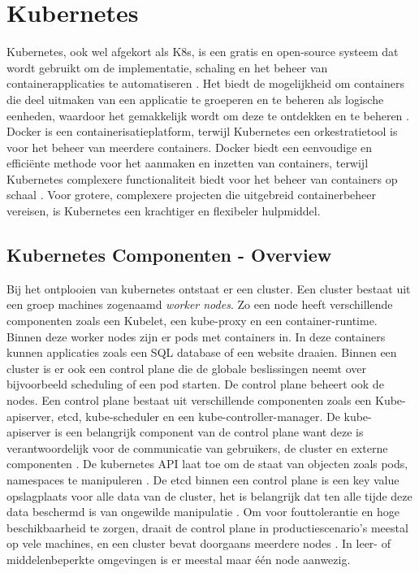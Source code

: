 \section{Kubernetes}
Kubernetes, ook wel afgekort als K8s, is een gratis en open-source systeem dat wordt gebruikt om de implementatie, schaling en het beheer van containerapplicaties te automatiseren \autocite{KubernetesDocs-2023}. 
Het biedt de mogelijkheid om containers die deel uitmaken van een applicatie te groeperen en te beheren als logische eenheden, waardoor het gemakkelijk wordt om deze te ontdekken en te beheren \autocite{KubernetesDocs-2023}.
Docker is een containerisatieplatform, terwijl Kubernetes een orkestratietool is voor het beheer van meerdere containers.
Docker biedt een eenvoudige en efficiënte methode voor het aanmaken en inzetten van containers, terwijl Kubernetes complexere functionaliteit biedt voor het beheer van containers op schaal \autocite{banerjee-2023}.
Voor grotere, complexere projecten die uitgebreid containerbeheer vereisen, is Kubernetes een krachtiger en flexibeler hulpmiddel.

\subsection{Kubernetes Componenten - Overview}
\autocite{KubernetesDocs-2023} Bij het ontplooien van kubernetes ontstaat er een cluster. Een cluster bestaat uit een groep machines zogenaamd \textit{worker nodes}. Zo een node heeft verschillende componenten zoals een Kubelet, een kube-proxy en een container-runtime.
Binnen deze worker nodes zijn er pods met containers in. In deze containers kunnen applicaties zoals een SQL database of een website draaien. 
\autocite{KubernetesDocs-2023} Binnen een cluster is er ook een control plane die de globale beslissingen neemt over bijvoorbeeld scheduling of een pod starten. De control plane beheert ook de nodes. 
\autocite{KubernetesDocs-2023} Een control plane bestaat uit verschillende componenten zoals een Kube-apiserver, etcd, kube-scheduler en een kube-controller-manager. 
De kube-apiserver is een belangrijk component van de control plane want deze is verantwoordelijk voor de communicatie van gebruikers, de cluster en externe componenten \autocite{hohn-2020}. 
De kubernetes API laat toe om de staat van objecten zoals pods, namespaces te manipuleren \autocite{KubernetesDocs-2023}.
De etcd binnen een control plane is een key value opslagplaats voor alle data van de cluster, het is belangrijk dat ten alle tijde deze data beschermd is van ongewilde manipulatie \autocite{KubernetesDocs-2023}. 
Om voor fouttolerantie en hoge beschikbaarheid te zorgen, draait de control plane in productiescenario's meestal op vele machines, en een cluster bevat doorgaans meerdere nodes \autocite{KubernetesDocs-2023}. 
In leer- of middelenbeperkte omgevingen is er meestal maar één node aanwezig.


